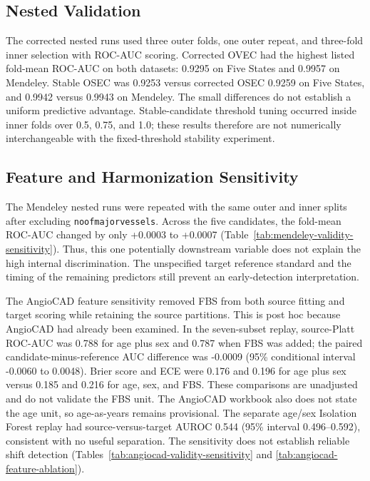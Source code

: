 \documentclass[12pt]{article}
\begin{document}
\subsection{Nested Validation}
The corrected nested runs used three outer folds, one outer repeat, and
three-fold inner selection with ROC-AUC scoring. Corrected OVEC had the
highest listed fold-mean ROC-AUC on both datasets: 0.9295 on Five States and
0.9957 on Mendeley. Stable OSEC was 0.9253 versus corrected OSEC 0.9259 on
Five States, and 0.9942 versus 0.9943 on Mendeley. The small differences do
not establish a uniform predictive advantage. Stable-candidate threshold
tuning occurred inside inner folds over 0.5, 0.75, and 1.0; these results
therefore are not numerically interchangeable with the fixed-threshold
stability experiment.

\subsection{Feature and Harmonization Sensitivity}\label{sec:validity-sensitivity}
The Mendeley nested runs were repeated with the same outer and inner splits
after excluding \texttt{noofmajorvessels}. Across the five candidates, the
fold-mean ROC-AUC changed by only +0.0003 to +0.0007
(Table~\ref{tab:mendeley-validity-sensitivity}). Thus, this one potentially
downstream variable does not explain the high internal discrimination. The
unspecified target reference
standard and the timing of the remaining predictors still prevent an
early-detection interpretation.

The AngioCAD feature sensitivity removed FBS from both source fitting and
target scoring while retaining the source partitions. This is post hoc because
AngioCAD had already been examined. In the seven-subset replay, source-Platt
ROC-AUC was 0.788 for age plus sex and 0.787 when FBS was added; the paired
candidate-minus-reference AUC difference was -0.0009 (95\% conditional
interval -0.0060 to 0.0048). Brier score and ECE were 0.176 and 0.196 for
age plus sex versus 0.185 and 0.216 for age, sex, and FBS. These comparisons
are unadjusted and do not validate the FBS unit. The AngioCAD workbook also
does not state the age unit, so age-as-years remains provisional. The separate
age/sex Isolation Forest replay had source-versus-target AUROC 0.544 (95\%
interval 0.496--0.592), consistent with no useful separation. The sensitivity
does not establish reliable shift detection
(Tables~\ref{tab:angiocad-validity-sensitivity} and
\ref{tab:angiocad-feature-ablation}).
\end{document}

